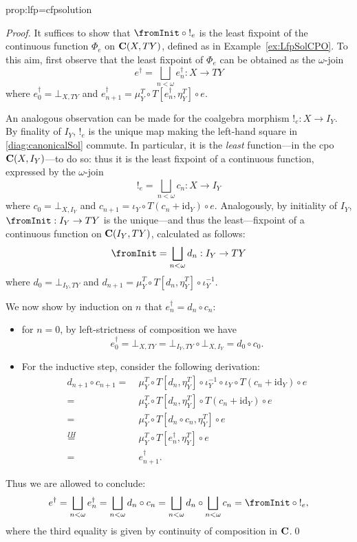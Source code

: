 \documentclass[oribibl,envcountsame,envcountsect,runningheads]{llncs}
\newcommand{\toFinal}[1]{{!_{#1}}}\DeclareMathSymbol{\fromInit}{\mathord}{operators}{"3C}
\renewcommand{\>}{\rangle}
\def\id{\mathrm{id}}
\def\lsol#1{{#1}^\dag} \def\gensol#1{{#1}^\dag} \def\ssol#1{{#1}^{\star}} \def\cansol#1{{#1}^\dag}
\def\carrier{I}
\newenvironment{proposition_for}[2][\empty]{\bigskip\noindent{\bf
    Proposition~\ref{#2}}\ifthenelse{\equal{#1}{\empty}}{{\bf.}}{ {\bf
      (#1).}}\it}{\vspace{0.5cm}}
\begin{document}
\begin{proposition_for}{prop:lfp=cfpsolution}
\proplfpcfpsolution
\end{proposition_for}
\begin{proof} It suffices to show that $\fromInit \circ \toFinal{e}$ is the least fixpoint of the continuous function $\Phi_e$ on $\mathbf{C}(X,TY)$, defined as in Example~\ref{ex:LfpSolCPO}. To this aim, first observe that the least fixpoint of $\Phi_e$ can be obtained as the $\omega$-join
\[\lsol e = \bigsqcup_{n< \omega}\lsol e_n : X \to TY\]
where $\lsol e_0 = \bot_{X,TY}$ and $\lsol e_{n+1} = \mu^T_Y \circ T[\lsol e_{n},\eta_Y^T] \circ e$.

An analogous observation can be made for the coalgebra morphism $\toFinal{e} : X \to \carrier_Y$. By finality of $\carrier_Y$, $\toFinal{e}$ is the unique map making the left-hand square in \eqref{diag:canonicalSol} commute. In particular, it is the \emph{least} function---in the cpo $\C(X, \carrier_Y)$---to do so: thus it is the least fixpoint of a continuous function, expressed by the $\omega$-join
\[\toFinal{e} = \bigsqcup_{n< \omega} c_n : X \to \carrier_Y\]
 where $c_0 = \bot_{X,\carrier_Y}$ and $c_{n+1} = \iota_Y \circ T(c_n + \id_Y) \circ e$.
 Analogously, by initiality of $\carrier_Y$, $\fromInit : \carrier_Y \to TY$ is the unique---and thus the least---fixpoint of a continuous function on $\C(\carrier_Y,TY)$, calculated as follows:
\[\fromInit = \bigsqcup_{n< \omega} d_n : \carrier_Y \to TY\]
 where $d_0 = \bot_{\carrier_Y,TY}$ and $d_{n+1} = \mu^T_Y \circ T[d_{n},\eta_Y^T] \circ \iota^{-1}_Y$.

\noindent We now show by induction on $n$ that $\lsol e_n = d_n \circ c_n$:
\begin{itemize}
  \item for $n=0$, by left-strictness of composition we have
      \[\lsol e_0 = \bot_{X,TY} = \bot_{\carrier_Y,TY} \circ \bot_{X,\carrier_Y} = d_0 \circ c_0.\]
  \item For the inductive step, consider the following derivation:
      \begin{align*}d_{n+1} \circ c_{n+1} =\ &  \mu^T_Y \circ T[d_n,\eta^T_Y] \circ \iota^{-1}_Y \circ \iota_Y \circ T(c_n + \id_Y) \circ e \\
       =\ & \mu^T_Y \circ T[d_n,\eta^T_Y] \circ T(c_n + \id_Y) \circ e \\
      =\ & \mu^T_Y \circ T[d_n\circ c_n,\eta^T_Y] \circ e\\
        \overset{IH}{=}\ & \mu^T_Y \circ T[\lsol e_n,\eta^T_Y] \circ e \\
        =\ &\lsol e_{n+1}.
      \end{align*}
\end{itemize}

\noindent Thus we are allowed to conclude:
\[\lsol e = \bigsqcup_{n< \omega}\lsol e_n = \bigsqcup_{n< \omega} d_n \circ c_n = \bigsqcup_{n< \omega} d_n \circ \bigsqcup_{n< \omega} c_n = \fromInit \circ \toFinal{e},\]
where the third equality is given by continuity of composition in $\mathbf{C}$.\qed
\end{proof}
\end{document}
